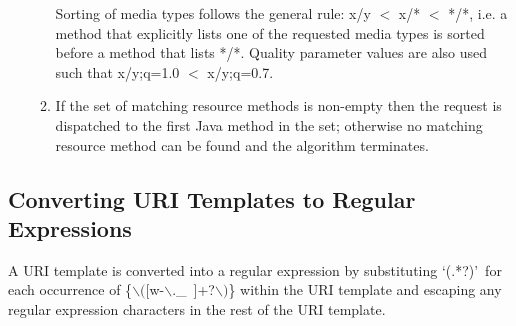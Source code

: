 \begin{enumerate}
\begin{enumerate}
Sorting of media types follows the general rule: x/y $<$ x/* $<$ */*, i.e. a method that explicitly lists one of the requested media types is sorted before a method that lists */*. Quality parameter values are also used such that x/y;q=1.0 $<$ x/y;q=0.7.

\item \label{dispatch_method} If the set of matching resource methods is non-empty then the request is dispatched to the first Java method in the set; otherwise no matching resource method can be found and the algorithm terminates.
\end{enumerate}

\end{enumerate}

\subsection{Converting URI Templates to Regular Expressions}
\label{template_to_regex}

A URI template is converted into a regular expression by substituting \lq(.*?)\rq\ for each occurrence of \{$\backslash($[w-$\backslash.$\_~]+?$\backslash)$\} within the URI template and escaping any regular expression characters in the rest of the URI template.
